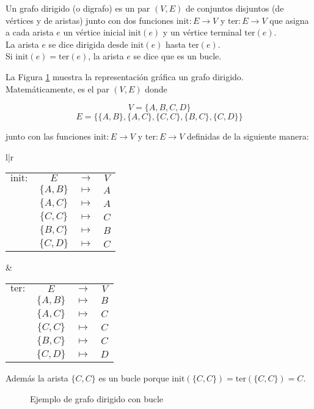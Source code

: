 \begin{defi}
	Un grafo dirigido (o digrafo) es un par $(V,E)$ de conjuntos disjuntos (de vértices y de aristas) junto con dos funciones $\mathrm{init} : E \to V$ y $\mathrm{ter} : E \to V$ que asigna a cada arista $e$ un vértice inicial $\mathrm{init}(e)$ y un vértice terminal $\mathrm{ter}(e)$.\\
	
	La arista $e$ se dice dirigida desde $\mathrm{init}(e)$ hasta $\mathrm{ter}(e)$.\\
	
	Si $\mathrm{init}(e) = \mathrm{ter}(e)$, la arista $e$ se dice que es un bucle.
\end{defi}

\begin{ejemplo}
	La Figura \ref*{fig:grafo_dirigido} muestra la representación gráfica un grafo dirigido. Matemáticamente, es el par $(V,E)$ donde
	
	\[V  = \{A, B, C, D\}\]
	\[E = \{ \{A,B\}, \{A,C\}, \{C,C\},\{B,C\}, \{C,D\} \} \]
	
	junto con las funciones $\mathrm{init} : E \to V $ y $\mathrm{ter} : E \to V$ definidas de la siguiente manera:
	
	\begin{center}
		\begin{tabular}{l|r}
			\begin{tabular}{r c c c}
				$\mathrm{init}:$ & $E$ & $\to$ & $V$\\
				& $\{A,B\}$ & $\mapsto$ & $A$\\
				& $\{A,C\}$ & $\mapsto$ & $A$\\
				& $\{C,C\}$ & $\mapsto$ & $C$\\
				& $\{B,C\}$ & $\mapsto$ & $B$\\
				& $\{C,D\}$ & $\mapsto$ & $C$\\
				
			\end{tabular} &
			\begin{tabular}{r c c c}
				$\mathrm{ter}:$ & $E$ & $\to$ & $V$\\
				& $\{A,B\}$ & $\mapsto$ & $B$\\
				& $\{A,C\}$ & $\mapsto$ & $C$\\
				& $\{C,C\}$ & $\mapsto$ & $C$\\
				& $\{B,C\}$ & $\mapsto$ & $C$\\
				& $\{C,D\}$ & $\mapsto$ & $D$\\
				
			\end{tabular} 
		\end{tabular}
	\end{center}
	
	Además la arista $\{C,C\}$ es un bucle porque $\mathrm{init}(\{C,C\}) = \mathrm{ter}(\{C,C\}) = C$.
	
	\begin{figure}[h]
		\centering
		\ejemplografodirigido
		\caption{Ejemplo de grafo dirigido con bucle}
		\label{fig:grafo_dirigido}
	\end{figure}
	
\end{ejemplo}

